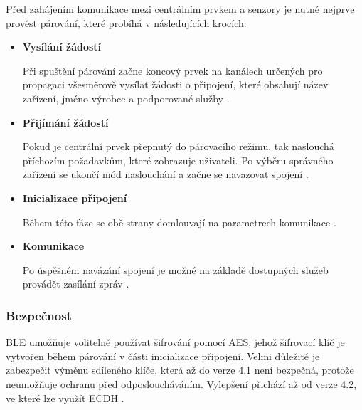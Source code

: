   Před zahájením komunikace mezi centrálním prvkem a senzory je nutné nejprve provést párování, 
  které probíhá v následujících krocích:
  \begin{itemize}
   \item \textbf{Vysílání žádostí}
   
   Při spuštění párování začne koncový prvek na kanálech určených pro propagaci všesměrově vysílat žádosti o připojení,
   které obsahují název zařízení, jméno výrobce a podporované služby \cite{ble-attack}.
   
   \item \textbf{Přijímání žádostí}
   
   Pokud je centrální prvek přepnutý do párovacího režimu, tak naslouchá příchozím požadavkům, které zobrazuje uživateli.
   Po výběru správného zařízení se ukončí mód naslouchání a začne se navazovat spojení \cite{ble-attack}.
   
   \item \textbf{Inicializace připojení} 
   
   Během této fáze se obě strany domlouvají na parametrech komunikace \cite{ble-attack}.
   \item \textbf{Komunikace}
   
   Po úspěšném navázání spojení je možné na základě dostupných služeb provádět zasílání zpráv \cite{ble-attack}.
  \end{itemize}

 
   \subsubsection{Bezpečnost}
   BLE umožňuje volitelně používat šifrování pomocí AES, jehož šifrovací klíč je 
   vytvořen během párování v části inicializace připojení. Velmi důležité je zabezpečit 
   výměnu sdíleného klíče, která až do verze 4.1 není bezpečná, protože neumožňuje ochranu
   před odposloucháváním. Vylepšení přichází až od verze 4.2, ve které lze využít ECDH \cite{cesnet-survey}.
   

